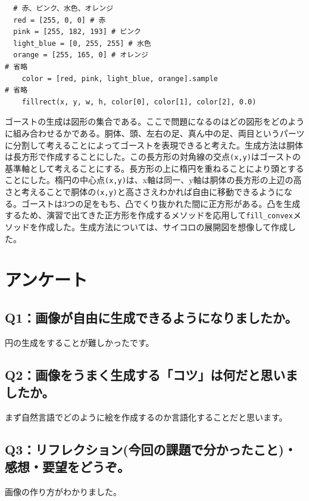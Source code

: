 \documentclass[12pt,a4j]{jarticle}
\begin{document}
\begin{verbatim}
  # 赤、ピンク、水色、オレンジ
  red = [255, 0, 0] # 赤
  pink = [255, 182, 193] # ピンク
  light_blue = [0, 255, 255] # 水色
  orange = [255, 165, 0] # オレンジ
# 省略
    color = [red, pink, light_blue, orange].sample
# 省略
    fillrect(x, y, w, h, color[0], color[1], color[2], 0.0)
\end{verbatim}

ゴーストの生成は図形の集合である。ここで問題になるのはどの図形をどのように組み合わせるかである。胴体、頭、左右の足、真ん中の足、両目というパーツに分割して考えることによってゴーストを表現できると考えた。生成方法は胴体は長方形で作成することにした。この長方形の対角線の交点\verb|(x,y)|はゴーストの基準軸として考えることにする。長方形の上に楕円を重ねることにより頭とすることにした。楕円の中心点\verb|(x,y)|は、x軸は同一、y軸は胴体の長方形の上辺の高さと考えることで胴体の\verb|(x,y)|と高ささえわかれば自由に移動できるようになる。ゴーストは3つの足をもち、凸でくり抜かれた間に正方形がある。凸を生成するため、演習で出てきた正方形を作成するメソッドを応用して\verb|fill_convex|メソッドを作成した。生成方法については、サイコロの展開図を想像して作成した。

\section{アンケート}

\subsection{Q1：画像が自由に生成できるようになりましたか。}

円の生成をすることが難しかったです。

\subsection{Q2：画像をうまく生成する「コツ」は何だと思いましたか。}

まず自然言語でどのように絵を作成するのか言語化することだと思います。

\subsection{Q3：リフレクション(今回の課題で分かったこと)・感想・要望をどうぞ。}

画像の作り方がわかりました。
\end{document}
